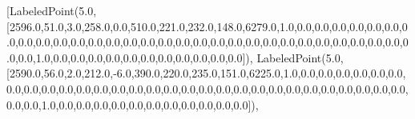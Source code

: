 \documentclass[11pt]{article}
\newenvironment{Shaded}{}{}
\newcommand{\FloatTok}[1]{\textcolor[rgb]{0.25,0.63,0.44}{{#1}}}
\newcommand{\NormalTok}[1]{{#1}}
\newcommand{\OperatorTok}[1]{\textcolor[rgb]{0.40,0.40,0.40}{{#1}}}
\begin{document}
\begin{Shaded}
\begin{Highlighting}[]
\NormalTok{[LabeledPoint(}\FloatTok{5.0}\NormalTok{, [}\FloatTok{2596.0}\NormalTok{,}\FloatTok{51.0}\NormalTok{,}\FloatTok{3.0}\NormalTok{,}\FloatTok{258.0}\NormalTok{,}\FloatTok{0.0}\NormalTok{,}\FloatTok{510.0}\NormalTok{,}\FloatTok{221.0}\NormalTok{,}\FloatTok{232.0}\NormalTok{,}\FloatTok{148.0}\NormalTok{,}\FloatTok{6279.0}\NormalTok{,}\FloatTok{1.0}\NormalTok{,}\FloatTok{0.0}\NormalTok{,}\FloatTok{0.0}\NormalTok{,}\FloatTok{0.0}\NormalTok{,}\FloatTok{0.0}\NormalTok{,}\FloatTok{0.0}\NormalTok{,}\FloatTok{0.0}\NormalTok{,}\FloatTok{0.0}\NormalTok{,}\FloatTok{0.0}\NormalTok{,}\FloatTok{0.0}\NormalTok{,}\FloatTok{0.0}\NormalTok{,}\FloatTok{0.0}\NormalTok{,}\FloatTok{0.0}\NormalTok{,}\FloatTok{0.0}\NormalTok{,}\FloatTok{0.0}\NormalTok{,}\FloatTok{0.0}\NormalTok{,}\FloatTok{0.0}\NormalTok{,}\FloatTok{0.0}\NormalTok{,}\FloatTok{0.0}\NormalTok{,}\FloatTok{0.0}\NormalTok{,}\FloatTok{0.0}\NormalTok{,}\FloatTok{0.0}\NormalTok{,}\FloatTok{0.0}\NormalTok{,}\FloatTok{0.0}\NormalTok{,}\FloatTok{0.0}\NormalTok{,}\FloatTok{0.0}\NormalTok{,}\FloatTok{0.0}\NormalTok{,}\FloatTok{0.0}\NormalTok{,}\FloatTok{0.0}\NormalTok{,}\FloatTok{0.0}\NormalTok{,}\FloatTok{0.0}\NormalTok{,}\FloatTok{0.0}\NormalTok{,}\FloatTok{1.0}\NormalTok{,}\FloatTok{0.0}\NormalTok{,}\FloatTok{0.0}\NormalTok{,}\FloatTok{0.0}\NormalTok{,}\FloatTok{0.0}\NormalTok{,}\FloatTok{0.0}\NormalTok{,}\FloatTok{0.0}\NormalTok{,}\FloatTok{0.0}\NormalTok{,}\FloatTok{0.0}\NormalTok{,}\FloatTok{0.0}\NormalTok{,}\FloatTok{0.0}\NormalTok{,}\FloatTok{0.0}\NormalTok{]),}
\NormalTok{ LabeledPoint(}\FloatTok{5.0}\NormalTok{, [}\FloatTok{2590.0}\NormalTok{,}\FloatTok{56.0}\NormalTok{,}\FloatTok{2.0}\NormalTok{,}\FloatTok{212.0}\NormalTok{,}\OperatorTok{-}\FloatTok{6.0}\NormalTok{,}\FloatTok{390.0}\NormalTok{,}\FloatTok{220.0}\NormalTok{,}\FloatTok{235.0}\NormalTok{,}\FloatTok{151.0}\NormalTok{,}\FloatTok{6225.0}\NormalTok{,}\FloatTok{1.0}\NormalTok{,}\FloatTok{0.0}\NormalTok{,}\FloatTok{0.0}\NormalTok{,}\FloatTok{0.0}\NormalTok{,}\FloatTok{0.0}\NormalTok{,}\FloatTok{0.0}\NormalTok{,}\FloatTok{0.0}\NormalTok{,}\FloatTok{0.0}\NormalTok{,}\FloatTok{0.0}\NormalTok{,}\FloatTok{0.0}\NormalTok{,}\FloatTok{0.0}\NormalTok{,}\FloatTok{0.0}\NormalTok{,}\FloatTok{0.0}\NormalTok{,}\FloatTok{0.0}\NormalTok{,}\FloatTok{0.0}\NormalTok{,}\FloatTok{0.0}\NormalTok{,}\FloatTok{0.0}\NormalTok{,}\FloatTok{0.0}\NormalTok{,}\FloatTok{0.0}\NormalTok{,}\FloatTok{0.0}\NormalTok{,}\FloatTok{0.0}\NormalTok{,}\FloatTok{0.0}\NormalTok{,}\FloatTok{0.0}\NormalTok{,}\FloatTok{0.0}\NormalTok{,}\FloatTok{0.0}\NormalTok{,}\FloatTok{0.0}\NormalTok{,}\FloatTok{0.0}\NormalTok{,}\FloatTok{0.0}\NormalTok{,}\FloatTok{0.0}\NormalTok{,}\FloatTok{0.0}\NormalTok{,}\FloatTok{0.0}\NormalTok{,}\FloatTok{0.0}\NormalTok{,}\FloatTok{1.0}\NormalTok{,}\FloatTok{0.0}\NormalTok{,}\FloatTok{0.0}\NormalTok{,}\FloatTok{0.0}\NormalTok{,}\FloatTok{0.0}\NormalTok{,}\FloatTok{0.0}\NormalTok{,}\FloatTok{0.0}\NormalTok{,}\FloatTok{0.0}\NormalTok{,}\FloatTok{0.0}\NormalTok{,}\FloatTok{0.0}\NormalTok{,}\FloatTok{0.0}\NormalTok{,}\FloatTok{0.0}\NormalTok{]),}

\end{Highlighting}
\end{Shaded}
\end{document}
